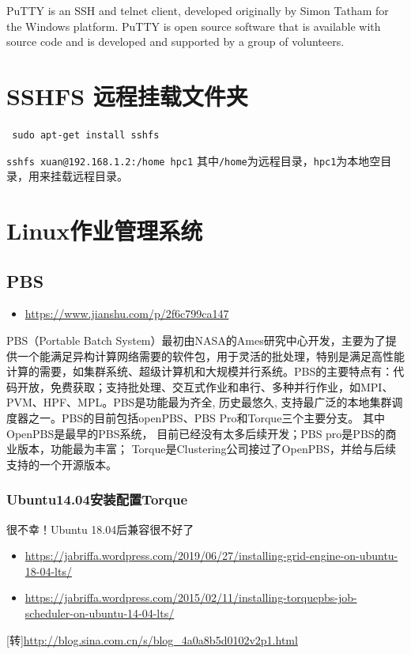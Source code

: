 {PuTTY is an SSH and telnet client, developed originally by Simon Tatham for the Windows platform. PuTTY is open source software that is available with source code and is developed and supported by a group of volunteers.


\section{SSHFS 远程挂载文件夹}
\verb| sudo apt-get install sshfs|

\verb*|sshfs xuan@192.168.1.2:/home hpc1|
其中\verb|/home|为远程目录，\verb|hpc1|为本地空目录，用来挂载远程目录。


\section{Linux作业管理系统}
\subsection{PBS}
\begin{itemize}
\item \url{https://www.jianshu.com/p/2f6c799ca147}
\end{itemize}


PBS（Portable Batch System）最初由NASA的Ames研究中心开发，主要为了提供一个能满足异构计算网络需要的软件包，用于灵活的批处理，特别是满足高性能计算的需要，如集群系统、超级计算机和大规模并行系统。PBS的主要特点有：代码开放，免费获取；支持批处理、交互式作业和串行、多种并行作业，如MPI、PVM、HPF、MPL。PBS是功能最为齐全, 历史最悠久, 支持最广泛的本地集群调度器之一。PBS的目前包括openPBS、PBS Pro和Torque三个主要分支。 其中OpenPBS是最早的PBS系统， 目前已经没有太多后续开发；PBS pro是PBS的商业版本，功能最为丰富； Torque是Clustering公司接过了OpenPBS，并给与后续支持的一个开源版本。


\subsubsection{Ubuntu14.04安装配置Torque}
{\color{red} 很不幸！Ubuntu 18.04后兼容很不好了}
\begin{itemize}
\item \url{https://jabriffa.wordpress.com/2019/06/27/installing-grid-engine-on-ubuntu-18-04-lts/}
\item \url{https://jabriffa.wordpress.com/2015/02/11/installing-torquepbs-job-scheduler-on-ubuntu-14-04-lts/}
\end{itemize}


[转]\url{http://blog.sina.com.cn/s/blog_4a0a8b5d0102v2p1.html}

}
